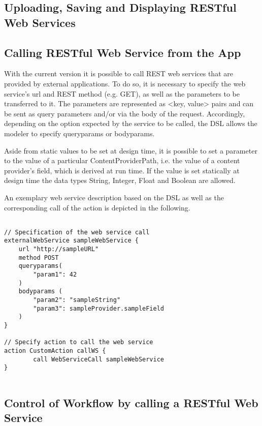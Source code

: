 
\subsection{Uploading, Saving and Displaying RESTful Web Services}
\label{subsec: UploadSaveDisplayWebServices}

\subsection{Calling RESTful Web Service from the App}
\label{subsec: CallingWebServices}
With the current \MD version it is possible to call REST web services that are provided by external applications. To do so, it is necessary to specify the web service's url and REST method (e.g. GET), as well as the parameters to be transferred to it. The parameters are represented as <key, value> pairs and can be sent as query parameters and/or via the body of the request. Accordingly, depending on the option expected by the service to be called, the DSL allows the modeler to specify queryparams or bodyparams. 

Aside from static values to be set at design time, it is possible to set a parameter to the value of a particular ContentProviderPath, i.e. the value of a content provider's field, which is derived at run time. If the value is set statically at design time the data types String, Integer, Float and Boolean are allowed. 

An exemplary web service description based on the DSL as well as the corresponding call of the action is depicted in the following.

\begin{lstlisting}

// Specification of the web service call
externalWebService sampleWebService {
	url "http://sampleURL"
	method POST
	queryparams(
		"param1": 42	
	)
	bodyparams (
		"param2": "sampleString"
		"param3": sampleProvider.sampleField
	)
}

// Specify action to call the web service
action CustomAction callWS {
		call WebServiceCall sampleWebService
}
	
\end{lstlisting}





\subsection{Control of Workflow by calling a RESTful Web Service}
\label{subsec: WorkflowControlThroughWS}